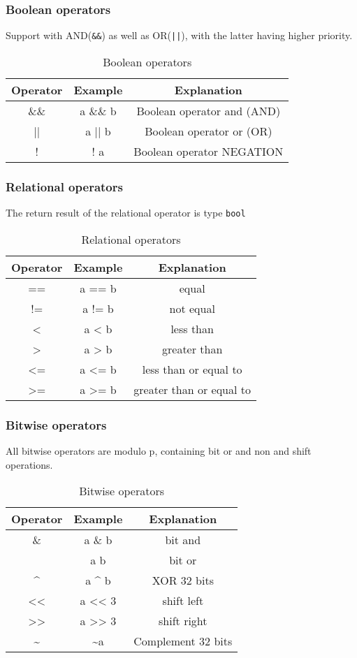 \subsubsection*{Boolean operators}

Support with AND(\texttt{\&\&}) as well as OR(\texttt{||}), with the latter having higher priority.

\begin{table}
\centering
\begin{tabular}{c|c|c}
Operator & Example & Explanation \\ \hline
\&\& & a \&\& b & Boolean operator and (AND) \\
|| & a || b & Boolean operator or (OR) \\
! & ! a & Boolean operator NEGATION \\
\end{tabular}
\caption{Boolean operators}
\end{table}

\subsubsection*{Relational operators}

The return result of the relational operator is type \texttt{bool}

\begin{table}
\centering
\begin{tabular}{c|c|c}
Operator & Example & Explanation \\ \hline
== & a == b & equal \\
!= & a != b & not equal \\
< & a < b & less than \\
> & a > b & greater than \\
<= & a <= b & less than or equal to \\
>= & a >= b & greater than or equal to \\
\end{tabular}
\caption{Relational operators}
\end{table}

\subsubsection*{Bitwise operators}

All bitwise operators are modulo p, containing bit or and non and shift operations.
\begin{table}
\centering
\begin{tabular}{c|c|c}
    Operator & Example & Explanation \\ \hline
    \& & a \& b & bit and \\
    \textbar{} & a \textbar{} b & bit or \\
    \textasciicircum{} & a \textasciicircum{} b & XOR 32 bits \\
    << & a << 3 & shift left \\
    >> & a >> 3 & shift right \\
    \textasciitilde{} & \textasciitilde{}a & Complement 32  bits \\
\end{tabular}
\caption{Bitwise operators}
\end{table}

